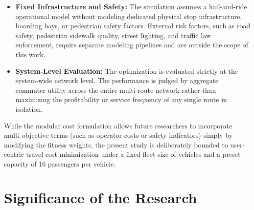 {\begin{itemize}
    \item \textbf{Fixed Infrastructure and Safety:} The simulation assumes a hail-and-ride operational model without modeling dedicated physical stop infrastructure, boarding bays, or pedestrian safety factors. External risk factors, such as road safety, pedestrian sidewalk quality, street lighting, and traffic law enforcement, require separate modeling pipelines and are outside the scope of this work.
    \item \textbf{System-Level Evaluation:} The optimization is evaluated strictly at the system-wide network level. The performance is judged by aggregate commuter utility across the entire multi-route network rather than maximizing the profitability or service frequency of any single route in isolation.
\end{itemize}
While the modular cost formulation allows future researchers to incorporate multi-objective terms (such as operator costs or safety indicators) simply by modifying the fitness weights, the present study is deliberately bounded to user-centric travel cost minimization under a fixed fleet size of vehicles and a preset capacity of 16 passengers per vehicle.}


\section{Significance of the Research}
